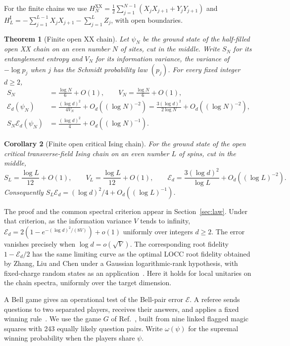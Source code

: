 \documentclass[10pt,a4paper]{article}
\newtheorem{theorem}{Theorem}
\newtheorem{corollary}[theorem]{Corollary}
\theoremstyle{remark}
\newcommand{\cE}{\mathcal{E}}
\begin{document}
For the finite chains we use
$H_N^{\mathrm{XX}}=\tfrac12\sum_{j=1}^{N-1}(X_jX_{j+1}+Y_jY_{j+1})$
and $H_L^{\mathrm I}=-\sum_{j=1}^{L-1}X_jX_{j+1}-\sum_{j=1}^{L}Z_j$,
with open boundaries.

\begin{theorem}[Finite open XX chain]\label{thm:xx-full-law}
Let $\psi_N$ be the ground state of the half-filled open XX chain on an
even number $N$ of sites, cut in the middle. Write $S_N$ for its
entanglement entropy and $V_N$ for its information variance, the variance
of $-\log p_j$ when $j$ has the Schmidt probability law $(p_j)$.
For every fixed integer $d\ge2$,
\begin{align}
 S_N&=\frac{\log N}{6}+O(1),\qquad
 V_N=\frac{\log N}{6}+O(1),\label{eq:xx-three-limits}\\
 \mathcal E_d(\psi_N)&=\frac{(\log d)^2}{4V_N}
      +O_d((\log N)^{-2})
   =\frac{3(\log d)^2}{2\log N}+O_d((\log N)^{-2}),\label{eq:xx-full-rate}\\
 S_N\mathcal E_d(\psi_N)&=\frac{(\log d)^2}{4}
      +O_d((\log N)^{-1}).\label{eq:xx-full-limit}
\end{align}
\end{theorem}

\begin{corollary}[Finite open critical Ising chain]\label{cor:ising-full-law}
For the ground state of the open critical transverse-field Ising chain
on an even number $L$ of spins, cut in the middle,
\[
 S_L=\frac{\log L}{12}+O(1),\qquad V_L=\frac{\log L}{12}+O(1),
 \qquad \mathcal E_d=\frac{3(\log d)^2}{\log L}
                +O_d((\log L)^{-2}).
\]
Consequently $S_L\mathcal E_d=(\log d)^2/4+O_d((\log L)^{-1})$.
\end{corollary}

The proof and the common spectral criterion appear in Section~\ref{sec:law}.
Under that criterion, as the information variance $V$ tends to infinity,
$\mathcal E_d=2(1-e^{-(\log d)^2/(8V)})+o(1)$ uniformly over integers
$d\ge2$. The error vanishes precisely when $\log d=o(\sqrt V)$.
The corresponding root fidelity $1-\mathcal E_d/2$ has the same limiting
curve as the optimal LOCC root fidelity obtained by Zhang, Liu and Chen
under a Gaussian logarithmic-rank hypothesis, with
fixed-charge random states as an application~\cite[Eq.~(6) and
Supplement, Theorem~1]{ZhangLiuChen26}. Here it holds for local unitaries
on the chain spectra, uniformly over the target dimension.

A Bell game gives an operational test of the Bell-pair error $\cE$.
A referee sends questions to two separated players, receives their answers,
and applies a fixed winning rule~\cite{CHSH69,CHTW04,BrunnerRMP}. We use the
game $G$ of Ref.~\cite{TG}, built from nine linked flagged magic squares with
243 equally likely question pairs. Write $\omega(\psi)$ for the supremal
winning probability when the players share $\psi$.
\end{document}
